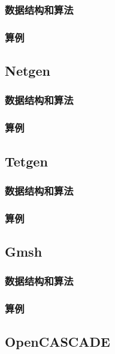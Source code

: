 \subsubsection{数据结构和算法}

\subsubsection{算例}

\subsection{Netgen}

\subsubsection{数据结构和算法}

\subsubsection{算例}

\subsection{Tetgen}

\subsubsection{数据结构和算法}

\subsubsection{算例}

\subsection{Gmsh}

\subsubsection{数据结构和算法}

\subsubsection{算例}

\subsection{OpenCASCADE}

